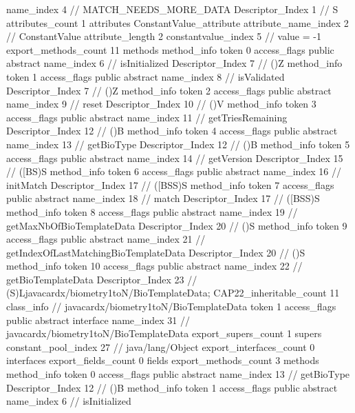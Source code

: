 {{{{{				name_index	4		// MATCH_NEEDS_MORE_DATA
				Descriptor_Index	1		// S
				attributes_count	1
				attributes {
				ConstantValue_attribute {
					attribute_name_index	2		// ConstantValue
					attribute_length	2
					constantvalue_index	5		// value = -1
				}
				}
			}
			}
			export_methods_count	11
			methods {
				method_info {
					token	0
					access_flags	public abstract
					name_index	6		// isInitialized
					Descriptor_Index	7		// ()Z
				}
				method_info {
					token	1
					access_flags	public abstract
					name_index	8		// isValidated
					Descriptor_Index	7		// ()Z
				}
				method_info {
					token	2
					access_flags	public abstract
					name_index	9		// reset
					Descriptor_Index	10		// ()V
				}
				method_info {
					token	3
					access_flags	public abstract
					name_index	11		// getTriesRemaining
					Descriptor_Index	12		// ()B
				}
				method_info {
					token	4
					access_flags	public abstract
					name_index	13		// getBioType
					Descriptor_Index	12		// ()B
				}
				method_info {
					token	5
					access_flags	public abstract
					name_index	14		// getVersion
					Descriptor_Index	15		// ([BS)S
				}
				method_info {
					token	6
					access_flags	public abstract
					name_index	16		// initMatch
					Descriptor_Index	17		// ([BSS)S
				}
				method_info {
					token	7
					access_flags	public abstract
					name_index	18		// match
					Descriptor_Index	17		// ([BSS)S
				}
				method_info {
					token	8
					access_flags	public abstract
					name_index	19		// getMaxNbOfBioTemplateData
					Descriptor_Index	20		// ()S
				}
				method_info {
					token	9
					access_flags	public abstract
					name_index	21		// getIndexOfLastMatchingBioTemplateData
					Descriptor_Index	20		// ()S
				}
				method_info {
					token	10
					access_flags	public abstract
					name_index	22		// getBioTemplateData
					Descriptor_Index	23		// (S)Ljavacardx/biometry1toN/BioTemplateData;
				}
			}
			CAP22_inheritable_count	11
		}
		class_info {		// javacardx/biometry1toN/BioTemplateData
			token	1
			access_flags	public abstract interface
			name_index	31		// javacardx/biometry1toN/BioTemplateData
			export_supers_count	1
			supers {
				constant_pool_index	27		// java/lang/Object
			}
			export_interfaces_count	0
			interfaces {
			}
			export_fields_count	0
			fields {
			}
			export_methods_count	3
			methods {
				method_info {
					token	0
					access_flags	public abstract
					name_index	13		// getBioType
					Descriptor_Index	12		// ()B
				}
				method_info {
					token	1
					access_flags	public abstract
					name_index	6		// isInitialized
}}}}}
